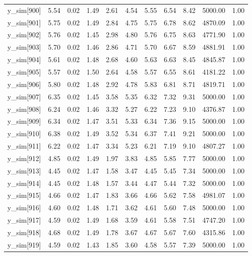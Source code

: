 \begin{table}[ht]
\begin{tabular}{rrrrrrrrrrr}
  y\_sim[900] & 5.54 & 0.02 & 1.49 & 2.61 & 4.54 & 5.55 & 6.54 & 8.42 & 5000.00 & 1.00 \\ 
  y\_sim[901] & 5.75 & 0.02 & 1.49 & 2.84 & 4.75 & 5.75 & 6.78 & 8.62 & 4870.09 & 1.00 \\ 
  y\_sim[902] & 5.76 & 0.02 & 1.45 & 2.98 & 4.80 & 5.76 & 6.75 & 8.63 & 4771.90 & 1.00 \\ 
  y\_sim[903] & 5.70 & 0.02 & 1.46 & 2.86 & 4.71 & 5.70 & 6.67 & 8.59 & 4881.91 & 1.00 \\ 
  y\_sim[904] & 5.61 & 0.02 & 1.48 & 2.68 & 4.60 & 5.63 & 6.63 & 8.45 & 4845.87 & 1.00 \\ 
  y\_sim[905] & 5.57 & 0.02 & 1.50 & 2.64 & 4.58 & 5.57 & 6.55 & 8.61 & 4181.22 & 1.00 \\ 
  y\_sim[906] & 5.80 & 0.02 & 1.48 & 2.92 & 4.78 & 5.83 & 6.81 & 8.71 & 4819.71 & 1.00 \\ 
  y\_sim[907] & 6.35 & 0.02 & 1.45 & 3.58 & 5.35 & 6.32 & 7.32 & 9.31 & 5000.00 & 1.00 \\ 
  y\_sim[908] & 6.24 & 0.02 & 1.46 & 3.32 & 5.27 & 6.22 & 7.23 & 9.10 & 4376.87 & 1.00 \\ 
  y\_sim[909] & 6.34 & 0.02 & 1.47 & 3.51 & 5.33 & 6.34 & 7.36 & 9.15 & 5000.00 & 1.00 \\ 
  y\_sim[910] & 6.38 & 0.02 & 1.49 & 3.52 & 5.34 & 6.37 & 7.41 & 9.21 & 5000.00 & 1.00 \\ 
  y\_sim[911] & 6.22 & 0.02 & 1.47 & 3.34 & 5.23 & 6.21 & 7.19 & 9.10 & 4807.27 & 1.00 \\ 
  y\_sim[912] & 4.85 & 0.02 & 1.49 & 1.97 & 3.83 & 4.85 & 5.85 & 7.77 & 5000.00 & 1.00 \\ 
  y\_sim[913] & 4.45 & 0.02 & 1.47 & 1.58 & 3.47 & 4.45 & 5.45 & 7.34 & 5000.00 & 1.00 \\ 
  y\_sim[914] & 4.45 & 0.02 & 1.48 & 1.57 & 3.44 & 4.47 & 5.44 & 7.32 & 5000.00 & 1.00 \\ 
  y\_sim[915] & 4.66 & 0.02 & 1.47 & 1.83 & 3.66 & 4.66 & 5.62 & 7.58 & 4981.07 & 1.00 \\ 
  y\_sim[916] & 4.60 & 0.02 & 1.48 & 1.71 & 3.62 & 4.61 & 5.60 & 7.48 & 5000.00 & 1.00 \\ 
  y\_sim[917] & 4.59 & 0.02 & 1.49 & 1.68 & 3.59 & 4.61 & 5.58 & 7.51 & 4747.20 & 1.00 \\ 
  y\_sim[918] & 4.68 & 0.02 & 1.49 & 1.78 & 3.67 & 4.67 & 5.67 & 7.60 & 4315.86 & 1.00 \\ 
  y\_sim[919] & 4.59 & 0.02 & 1.43 & 1.85 & 3.60 & 4.58 & 5.57 & 7.39 & 5000.00 & 1.00 \\ 

\end{tabular}
\end{table}
